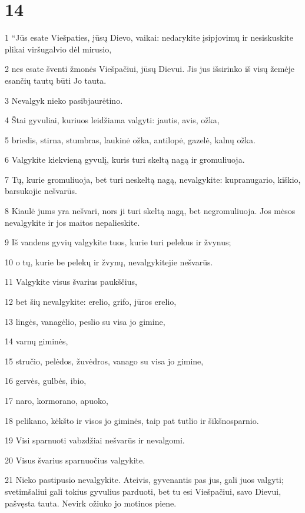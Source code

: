 \chapter{14}

\par 1 “Jūs esate Viešpaties, jūsų Dievo, vaikai: nedarykite įsipjovimų ir nesiskuskite plikai viršugalvio dėl mirusio, 
\par 2 nes esate šventi žmonės Viešpačiui, jūsų Dievui. Jis jus išsirinko iš visų žemėje esančių tautų būti Jo tauta. 
\par 3 Nevalgyk nieko pasibjaurėtino. 
\par 4 Štai gyvuliai, kuriuos leidžiama valgyti: jautis, avis, ožka, 
\par 5 briedis, stirna, stumbras, laukinė ožka, antilopė, gazelė, kalnų ožka. 
\par 6 Valgykite kiekvieną gyvulį, kuris turi skeltą nagą ir gromuliuoja. 
\par 7 Tų, kurie gromuliuoja, bet turi neskeltą nagą, nevalgykite: kupranugario, kiškio, barsuko­jie nešvarūs. 
\par 8 Kiaulė jums yra nešvari, nors ji turi skeltą nagą, bet negromuliuoja. Jos mėsos nevalgykite ir jos maitos nepalieskite. 
\par 9 Iš vandens gyvių valgykite tuos, kurie turi pelekus ir žvynus; 
\par 10 o tų, kurie be pelekų ir žvynų, nevalgykite­jie nešvarūs. 
\par 11 Valgykite visus švarius paukščius, 
\par 12 bet šių nevalgykite: erelio, grifo, jūros erelio, 
\par 13 lingės, vanagėlio, peslio su visa jo gimine, 
\par 14 varnų giminės, 
\par 15 stručio, pelėdos, žuvėdros, vanago su visa jo gimine, 
\par 16 gervės, gulbės, ibio, 
\par 17 naro, kormorano, apuoko, 
\par 18 pelikano, kėkšto ir visos jo giminės, taip pat tutlio ir šikšnosparnio. 
\par 19 Visi sparnuoti vabzdžiai nešvarūs ir nevalgomi. 
\par 20 Visus švarius sparnuočius valgykite. 
\par 21 Nieko pastipusio nevalgykite. Ateivis, gyvenantis pas jus, gali juos valgyti; svetimšaliui gali tokius gyvulius parduoti, bet tu esi Viešpačiui, savo Dievui, pašvęsta tauta. Nevirk ožiuko jo motinos piene. 
